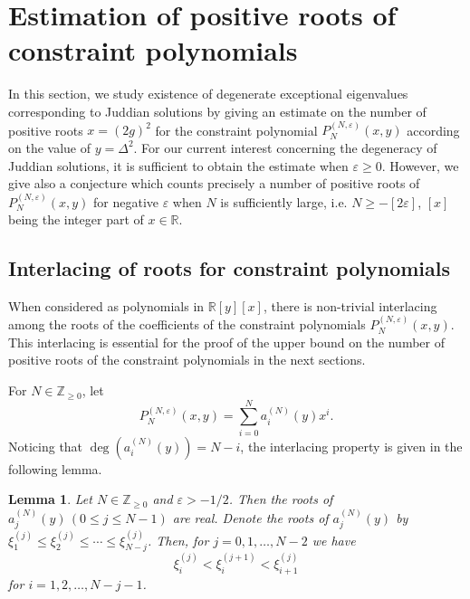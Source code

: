 \documentclass[11pt]{article}
\numberwithin{equation}{section}
\newcommand{\Z}{\mathbb{Z}} %
\newcommand{\R}{\mathbb{R}} %
\newcommand{\e}{\varepsilon}
\newcommand{\cp}[2]{P^{(#1)}_{#2}} %
\theoremstyle{plain}
\newtheorem{lem}[thm]{Lemma}
\theoremstyle{definition}
\theoremstyle{remark}
\begin{document}
\section{Estimation of positive roots of constraint polynomials} \label{sec:estimation}

In this section, we study existence of degenerate exceptional eigenvalues corresponding to Juddian solutions
by giving an estimate on the number of positive roots \(x=(2g)^2\) for the constraint polynomial \(\cp{N,\e}{N}(x,y)\) according
on the value of  \(y = \Delta^2 \). For our current interest concerning the degeneracy of Juddian solutions, it is sufficient to obtain
the estimate when $\e\geq0$. However, we give also a conjecture which counts precisely a number of positive roots of \(\cp{N,\e}{N}(x,y)\)
for negative $\e$ when $N$ is sufficiently large, i.e. $N\geq -[2\e]$, $[x]$ being the integer part of $x\in \R$.

\subsection{Interlacing of roots for constraint polynomials} \label{sec:interlacing}

When considered as polynomials in \(\R[y][x]\), there is non-trivial interlacing among the roots of the coefficients of the
constraint polynomials \(\cp{N,\e}{N}(x,y)\). This interlacing is essential for the proof of the upper bound on the number of
positive roots of the constraint polynomials in the next sections.

For \(N \in \Z_{\geq 0}\), let
\[
  \cp{N,\e}{N}(x,y) = \sum_{i=0}^{N} a^{(N)}_i(y) x^i.
\]
Noticing that \(\deg(a^{(N)}_i(y)) = N-i \), the interlacing property is given in the following lemma.

\begin{lem}
  \label{lem:rootcoeff}
  Let \( N \in \Z_{\geq 0}\) and \(\e > -1/2 \). Then the roots of \(a^{(N)}_j(y) \, ( 0 \leq j \leq N-1) \) are real. Denote the roots
  of \(a^{(N)}_j(y)\) by \(\xi_1^{(j)} \leq \xi_2^{(j)} \leq \cdots \leq \xi_{N-j}^{(j)}  \). Then, for \(j = 0,1,\ldots,N-2\) we have
  \[
    \xi_{i}^{(j)} < \xi_{i}^{(j+1)} < \xi_{i+1}^{(j)}
  \]
  for \( i = 1,2,\ldots, N-j-1 \).
\end{lem}
\end{document}
